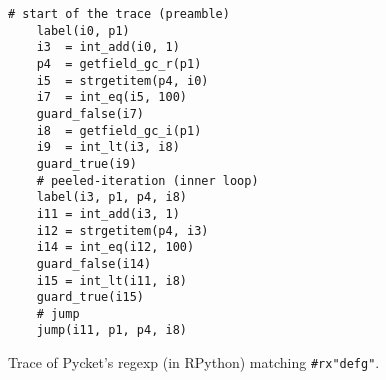 \begin{figure}[!htbp]
	\centering

	\begin{minipage}{0.3\textwidth}
		\begin{lstlisting}[language=rptrace, basicstyle=\ttfamily\scriptsize]
    # start of the trace (preamble)
    label(i0, p1)
    i3  = int_add(i0, 1)
    p4  = getfield_gc_r(p1)
    i5  = strgetitem(p4, i0)
    i7  = int_eq(i5, 100)
    guard_false(i7)
    i8  = getfield_gc_i(p1)
    i9  = int_lt(i3, i8)
    guard_true(i9)
    # peeled-iteration (inner loop)
    label(i3, p1, p4, i8)
    i11 = int_add(i3, 1)
    i12 = strgetitem(p4, i3)
    i14 = int_eq(i12, 100)
    guard_false(i14)
    i15 = int_lt(i11, i8)
    guard_true(i15)
    # jump
    jump(i11, p1, p4, i8)
		\end{lstlisting}
	\end{minipage}
\caption{\small Trace of Pycket's regexp (in RPython) matching
		{\tt\#rx"defg"}.}
\label{fig:regexp-example-trace}
\end{figure}